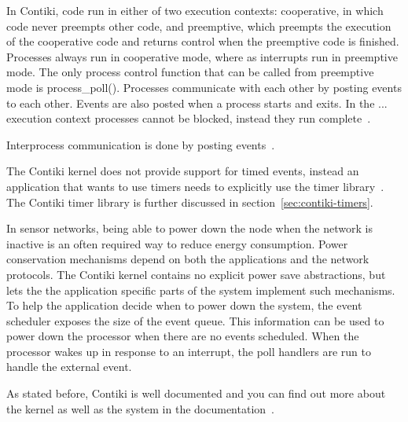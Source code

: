 In Contiki, code run in either of two execution contexts:
cooperative, in which code never preempts other code, and preemptive,
which preempts the execution of the cooperative code and returns control
when the preemptive code is finished.
Processes always run in cooperative mode, where as interrupts run in preemptive mode.
The only process control function that can be called from preemptive mode is process\_poll(). 
Processes communicate with each other by posting events to each other.
Events are also posted when a process starts and exits.
In the ... execution context processes cannot be blocked,
instead they run complete~\cite{video, paper-contiki}.

Interprocess communication is done by posting events~\cite{paper-contiki}.

The Contiki kernel does not provide support for timed events,
instead an application that wants to use timers needs to explicitly use the timer library~\cite{contiki-docs}.
The Contiki timer library is further discussed in section~\ref{sec:contiki-timers}.

In sensor networks, being able to power down the node
when the network is inactive is an often required way to reduce energy consumption.
Power conservation mechanisms
depend on both the applications and the network protocols.
The Contiki kernel contains no explicit power
save abstractions, but lets the the application specific parts
of the system implement such mechanisms.
To help the application decide when to power down the system, the event
scheduler exposes the size of the event queue.
This information can be used to power down the processor when there
are no events scheduled. When the processor wakes up in
response to an interrupt, the poll handlers are run to handle the external event.

As stated before, Contiki is well documented and you can find out more about
the kernel as well as the system in the documentation~\cite{contiki-docs}.

